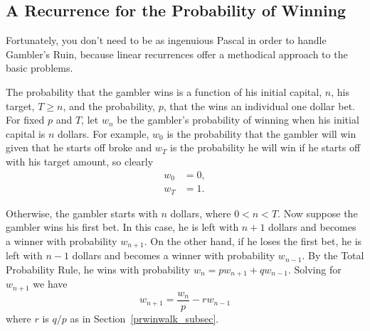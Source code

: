 \subsection{A Recurrence for the Probability of Winning}

Fortunately, you don't need to be as ingenuious Pascal in order to
handle Gambler's Ruin, because linear recurrences offer a methodical
approach to the basic problems.

The probability that the gambler wins is a function of his initial
capital, $n$, his target, $T \geq n$, and the probability, $p$, that
the wins an individual one dollar bet.  For fixed $p$ and $T$, let
$w_n$ be the gambler's probability of winning when his initial
capital is $n$ dollars.  For example, $w_0$ is the probability that
the gambler will win given that he starts off broke and $w_T$ is the
probability he will win if he starts off with his target amount, so
clearly
\begin{align}
w_0 & = 0,\label{LN12:w0}\\
w_T & = 1. \label{LN12:wT}
\end{align}

Otherwise, the gambler starts with $n$ dollars, where $0 < n < T$.
Now suppose the gambler wins his first bet.  In this case, he is left
with $n+1$ dollars and becomes a winner with probability $w_{n+1}$.
On the other hand, if he loses the first bet, he is left with $n-1$
dollars and becomes a winner with probability $w_{n-1}$.  By the Total
Probability Rule, he wins with probability $w_n = p w_{n+1} + q
w_{n-1}$.  Solving for $w_{n+1}$ we have
\begin{equation}\label{LN12:rec1}
w_{n+1} = \frac{w_n}{p} - r w_{n-1}
\end{equation}
where $r$ is $q/p$ as in Section~\ref{prwinwalk_subsec}.

